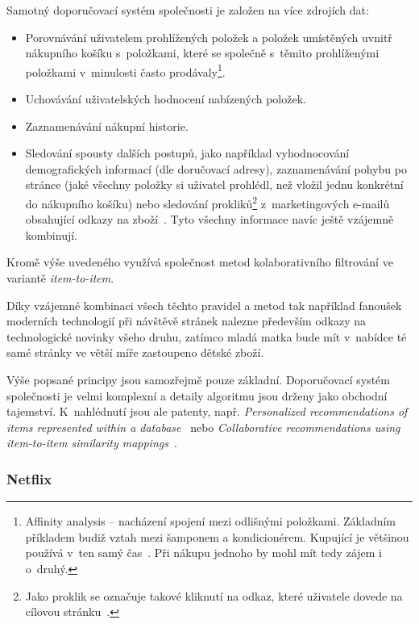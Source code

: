 \documentclass[thesis=M,czech]{FITthesis}[2014/05/07]
\begin{document}
Samotný doporučovací systém společnosti je založen na více zdrojích dat:

\begin{itemize}
	\item Porovnávání uživatelem prohlížených položek a položek umístěných uvnitř nákupního košíku s~položkami, které se společně s~těmito prohlíženými položkami v~minulosti často prodávaly\footnote{Affinity analysis – nacházení spojení mezi odlišnými položkami. Základním příkladem budiž vztah mezi šamponem a kondicionérem. Kupující je většinou používá v~ten samý čas~\cite{affinity}. Při nákupu jednoho by mohl mít tedy zájem i o~druhý.}.
	\item Uchovávání uživatelských hodnocení nabízených položek.
	\item Zaznamenávání nákupní historie.
	\item Sledování spousty dalších postupů, jako například vyhodnocování demografických informací (dle doručovací adresy), zaznamenávání pohybu po stránce (jaké všechny položky si uživatel prohlédl, než vložil jednu konkrétní do nákupního košíku) nebo sledování prokliků\footnote{Jako proklik se označuje takové kliknutí na odkaz, které uživatele dovede na cílovou stránku~\cite{proklik}.} z~marketingových e-mailů obsahující odkazy na zboží~\cite{amazonrec}. Tyto všechny informace navíc ještě vzájemně kombinují.
\end{itemize}

Kromě výše uvedeného využívá společnost metod kolaborativního filtrování ve variantě \emph{item-to-item}.

Díky vzájemné kombinaci všech těchto pravidel a metod tak například fanoušek moderních technologií při návštěvě stránek nalezne především odkazy na technologické novinky všeho druhu, zatímco mladá matka bude mít v~nabídce té samé stránky ve větší míře zastoupeno dětské zboží.
 
Výše popsané principy jsou samozřejmě pouze základní. Doporučovací systém společnosti je velmi komplexní a detaily algoritmu jsou drženy jako obchodní tajemství. K~nahlédnutí jsou ale patenty, např. \emph{Personalized recommendations of items represented within a database}~\cite{jacobi2006personalized} nebo \emph{Collaborative recommendations using item-to-item similarity mappings}~\cite{linden2001collaborative}.

\subsubsection{Netflix}
\end{document}
